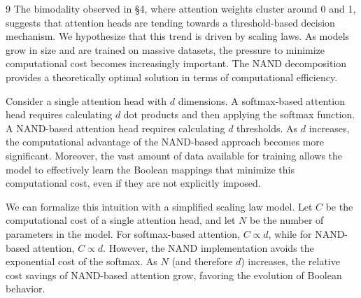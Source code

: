 \documentclass[11pt]{article}
\theoremstyle{definition}
\begin{document}
\begin{thebibliography}{9}
The bimodality observed in §4, where attention weights cluster around 0 and 1, suggests that attention heads are tending towards a threshold-based decision mechanism.  We hypothesize that this trend is driven by scaling laws. As models grow in size and are trained on massive datasets, the pressure to minimize computational cost becomes increasingly important. The NAND decomposition provides a theoretically optimal solution in terms of computational efficiency.













Consider a single attention head with $d$ dimensions. A softmax-based attention head requires calculating $d$ dot products and then applying the softmax function. A NAND-based attention head requires calculating $d$ thresholds. As $d$ increases, the computational advantage of the NAND-based approach becomes more significant. Moreover, the vast amount of data available for training allows the model to effectively learn the Boolean mappings that minimize this computational cost, even if they are not explicitly imposed.













We can formalize this intuition with a simplified scaling law model. Let $C$ be the computational cost of a single attention head, and let $N$ be the number of parameters in the model.  For softmax-based attention, $C \propto d$, while for NAND-based attention, $C \propto d$. However, the NAND implementation avoids the exponential cost of the softmax. As $N$ (and therefore $d$) increases, the relative cost savings of NAND-based attention grow, favoring the evolution of Boolean behavior.













\begin{figure}[h!]






    \centering







\end{figure}
\end{thebibliography}
\end{document}
